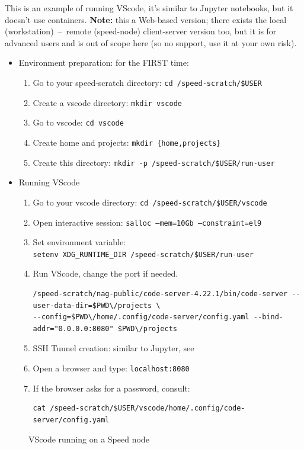 This is an example of running VScode, it's similar to Jupyter notebooks, but 
it doesn't use containers. \textbf{Note:} this a Web-based version; there exists the local
(workstation)~--~remote (speed-node) client-server version too, but it is for advanced users
and is out of scope here (so no support, use it at your own risk).
 
\begin{itemize}

\item
Environment preparation: for the FIRST time:
\begin{enumerate}
\item
Go to your speed-scratch directory: \texttt{cd /speed-scratch/\$USER}
\item
Create a vscode directory: \texttt{mkdir vscode}
\item
Go to vscode: \texttt{cd vscode}
\item
Create home and projects: \texttt{mkdir \{home,projects\}}
\item
Create this directory: \texttt{mkdir -p /speed-scratch/\$USER/run-user}
\end{enumerate}

\item
Running VScode
\begin{enumerate}
\item 
Go to your vscode directory: \texttt{cd /speed-scratch/\$USER/vscode}
\item
Open interactive session: \texttt{salloc --mem=10Gb --constraint=el9}
\item
Set environment variable:\\\texttt{setenv XDG\_RUNTIME\_DIR /speed-scratch/\$USER/run-user}
\item 
Run VScode, change the port if needed.
\scriptsize
\begin{verbatim}
/speed-scratch/nag-public/code-server-4.22.1/bin/code-server --user-data-dir=$PWD\/projects \
--config=$PWD\/home/.config/code-server/config.yaml --bind-addr="0.0.0.0:8080" $PWD\/projects
\end{verbatim}
\normalsize
\item
SSH Tunnel creation: similar to Jupyter, see 
\item
Open a browser and type: \texttt{localhost:8080}
\item
If the browser asks for a password, consult:
\begin{verbatim}
cat /speed-scratch/$USER/vscode/home/.config/code-server/config.yaml
\end{verbatim}

\end{enumerate}
\end{itemize}

\begin{figure}[htbp]
	\centering
	\caption{VScode running on a Speed node}
	\label{fig:vscode}
\end{figure}